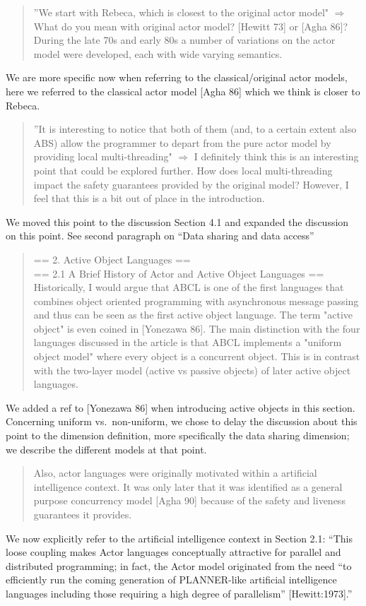 \documentclass{article}
\begin{document}
 \begin{quote}
	”We start with Rebeca, which is closest to the original actor model" $\Rightarrow$ 
	What do you 
mean with original actor model? [Hewitt 73] or [Agha 86]? During the late 70s and early 
80s a number of variations on the actor model were developed, each with wide varying 
semantics.
\end{quote}
We are more specific now when referring to the classical/original actor models, 
here we referred to the classical actor model [Agha 86] which we think is closer to 
Rebeca.

\begin{quote}
	”It is interesting to notice that both of them (and, to a certain extent also ABS) 
allow the programmer to depart from the pure actor model by providing local 
multi-threading" $\Rightarrow$ I definitely think this is an interesting point that could 
be 
explored further. How does local multi-threading impact the safety guarantees provided by 
the original model? However, I feel that this is a bit out of place in the introduction.
\end{quote}
We moved this point to the discussion Section 4.1 and expanded the discussion on this 
point. See second paragraph on ``Data sharing and data access''



\begin{quote}
== 2. Active Object Languages ==\\
== 2.1 A Brief History of Actor and Active Object Languages ==\\
	Historically, I would argue that ABCL is one of the first languages that combines 
	object 
oriented programming with asynchronous message passing and thus can be seen as the first 
active object language. The term "active object" is even coined in [Yonezawa 86]. The 
main distinction with the four languages discussed in the article is that ABCL implements 
a "uniform object model" where every object is a concurrent object. This is in contrast 
with the two-layer model (active vs passive objects) of later active object languages.
\end{quote}
 We added a ref to [Yonezawa 86] when introducing active objects in this section.
Concerning uniform vs.\ non-uniform, we chose to delay the discussion about this point to 
the 
dimension definition, more specifically the data sharing dimension;  we describe the 
different 
models at that point.


\begin{quote}
	Also, actor languages were originally motivated within a artificial intelligence 
	context. 
It was only later that it was identified as a general purpose concurrency model [Agha 90] 
because of the safety and liveness guarantees it provides.
\end{quote}
We now explicitly refer to the artificial intelligence context in Section 2.1:
``This loose coupling makes Actor languages conceptually
attractive for parallel and distributed programming; in fact, 
the Actor model originated from the need ``to efficiently run the
coming generation of PLANNER-like artificial intelligence languages
including those requiring a high degree of parallelism''
[Hewitt:1973].''
\end{document}
